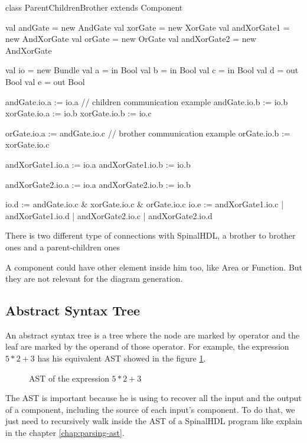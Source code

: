 \begin{listing}
    \centering
    \begin{scalacode}
    class ParentChildrenBrother extends Component
    {
        val andGate = new AndGate
        val xorGate = new XorGate
        val andXorGate1 = new AndXorGate
        val orGate = new OrGate
        val andXorGate2 = new AndXorGate

        val io = new Bundle
        {
            val a = in Bool
            val b = in Bool
            val c = in Bool
            val d = out Bool
            val e = out Bool
        }

        andGate.io.a := io.a            // children communication example
        andGate.io.b := io.b
        xorGate.io.a := io.b
        xorGate.io.b := io.c

        orGate.io.a := andGate.io.c     // brother communication example
        orGate.io.b := xorGate.io.c     

        andXorGate1.io.a := io.a
        andXorGate1.io.b := io.b

        andXorGate2.io.a := io.a
        andXorGate2.io.b := io.b

        io.d := andGate.io.c & xorGate.io.c & orGate.io.c
        io.e := andXorGate1.io.c | andXorGate1.io.d | andXorGate2.io.c | andXorGate2.io.d
    }
    \end{scalacode}
    \caption[Type of connection in SpinalHDL]{There is two different type of
      connections with SpinalHDL, a brother to brother ones and a
      parent-children ones}
    \label{lst:HierarchicComponent-solo}
\end{listing}

A component could have other element inside him too, like Area or Function. But
they are not relevant for the diagram generation.

\subsection{Abstract Syntax Tree}
\label{sub:Abstract Syntax Tree}

An abstract syntax tree is a tree where the node are marked by operator and the
leaf are marked by the operand of those operator. For example, the expression $5
* 2 + 3$ has his equivalent AST showed in the figure \ref{fig:ast-example}.

\begin{figure}[H]
    \centering
    \caption[Example of an AST]{AST of the expression $5 * 2 + 3$}
    \label{fig:ast-example}
\end{figure} %

The AST is important because he is using to recover all the input and the output
of a component, including the source of each input's component. To do that, we
just need to recursively walk inside the AST of a SpinalHDL program like explain
in the chapter \ref{chap:parsing-ast}.